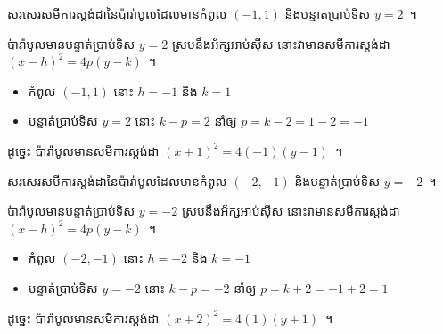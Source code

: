 %
\begin{example*}
	សរសេរសមីការស្តង់ដានៃប៉ារ៉ាបូលដែលមានកំពូល $ (-1,1) $ និងបន្ទាត់ប្រាប់ទិស $ y=2 $~។
\end{example*}
%
\begin{answer}
	ប៉ារ៉ាបូលមានបន្ទាត់ប្រាប់ទិស $ y=2 $ ស្របនឹងអ័ក្សអាប់ស៊ីស​ នោះវាមានសមីការស្តង់ដា $ (x-h)^2=4p(y-k) $~។
	\begin{itemize}
		\item កំពូល $ (-1,1) $ នោះ $ h=-1 $ និង $ k=1 $
		\item បន្ទាត់ប្រាប់ទិស $ y=2 $ នោះ $ k-p=2 $ នាំឲ្យ $ p=k-2=1-2=-1 $
	\end{itemize}
	ដូច្នេះ ប៉ារ៉ាបូលមានសមីការស្តង់ដា $ (x+1)^2=4(-1)(y-1) $~។
\end{answer}
%
\begin{example*}
	សរសេរសមីការស្តង់ដានៃប៉ារ៉ាបូលដែលមានកំពូល $ (-2,-1) $ និងបន្ទាត់ប្រាប់ទិស $ y=-2 $~។
\end{example*}
%
\begin{answer}
	ប៉ារ៉ាបូលមានបន្ទាត់ប្រាប់ទិស $ y=-2 $ ស្របនឹងអ័ក្សអាប់ស៊ីស​ នោះវាមានសមីការស្តង់ដា $ (x-h)^2=4p(y-k) $~។
	\begin{itemize}
		\item កំពូល $ (-2,-1) $ នោះ $ h=-2 $ និង $ k=-1 $
		\item បន្ទាត់ប្រាប់ទិស $ y=-2 $ នោះ $ k-p=-2 $ នាំឲ្យ $ p=k+2=-1+2=1 $
	\end{itemize}
	ដូច្នេះ ប៉ារ៉ាបូលមានសមីការស្តង់ដា $ (x+2)^2=4(1)(y+1) $~។
\end{answer}
%
